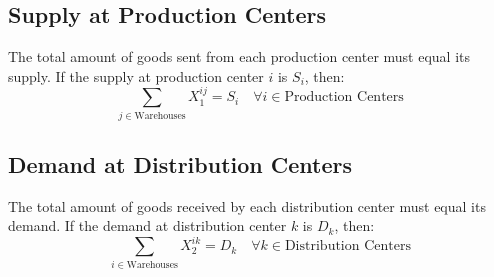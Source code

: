 \documentclass[12pt]{article}
\begin{document}
\subsection*{Supply at Production Centers}
The total amount of goods sent from each production center must equal its supply. If the supply at production center \( i \) is \( S_i \), then:
\[
\sum_{j \in \text{Warehouses}} X_1^{ij} = S_i \quad \forall i \in \text{Production Centers}
\]

\subsection*{Demand at Distribution Centers}
The total amount of goods received by each distribution center must equal its demand. If the demand at distribution center \( k \) is \( D_k \), then:
\[
\sum_{i \in \text{Warehouses}} X_2^{ik} = D_k \quad \forall k \in \text{Distribution Centers}
\]
\end{document}
